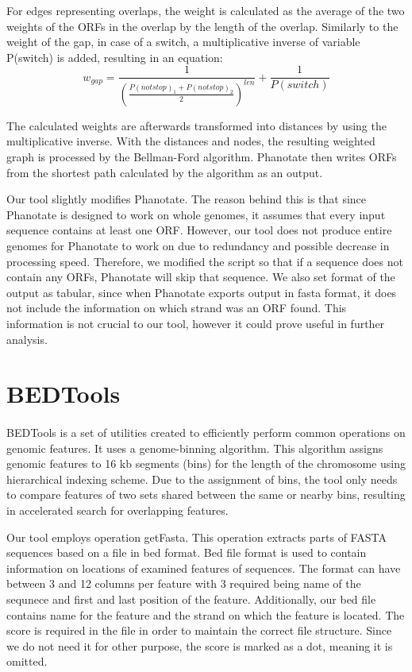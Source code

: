 For edges representing overlaps, the weight is calculated as the average of the two weights of the ORFs in the overlap by the length of the overlap. Similarly to the weight of the gap, in case of a switch, a multiplicative inverse of variable P(switch) is added, resulting in an equation:
\[w_{gap} = \frac{1}{(\frac{P(not stop)_{1} + P(not stop)_{2}}{2})^{len}} + \frac{1}{P(switch)}\]

The calculated weights are afterwards transformed into distances by using the multiplicative inverse. With the distances and nodes, the resulting weighted graph is processed by the Bellman-Ford algorithm. Phanotate then writes ORFs from the shortest path calculated by the algorithm as an output.

Our tool slightly modifies Phanotate. The reason behind this is that since Phanotate is designed to work on whole genomes, it assumes that every input sequence contains at least one ORF. However, our tool does not produce entire genomes for Phanotate to work on due to redundancy and possible decrease in processing speed. Therefore, we modified the script so that if a sequence does not contain any ORFs, Phanotate will skip that sequence. We also set format of the output as tabular, since when Phanotate exports output in fasta format, it does not include the information on which strand was an ORF found. This information is not crucial to our tool, however it could prove useful in further analysis.

\section{BEDTools}
\paragraph*{}
BEDTools\cite{quinlan2010bedtools} is a set of utilities created to efficiently perform common operations on genomic features. It uses a genome-binning algorithm. This algorithm assigns genomic features to 16 kb segments (bins) for the length of the chromosome using hierarchical indexing scheme. Due to the assignment of bins, the tool only needs to compare features of two sets shared between the same or nearby bins, resulting in accelerated search for overlapping features.

Our tool employs operation getFasta. This operation extracts parts of FASTA sequences based on a file in bed format. Bed file format is used to contain information on locations of examined features of sequences. The format can have between 3 and 12 columns per feature with 3 required being name of the sequnece and first and last position of the feature. Additionally, our bed file contains name for the feature and the strand on which the feature is located. The score is required in the file in order to maintain the correct file structure. Since we do not need it for other purpose, the score is marked as a dot, meaning it is omitted.

